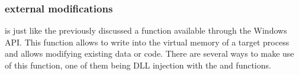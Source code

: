 \subsubsection{ external modifications}
 is just like the previously discussed  a function available through the Windows API. This function allows to write into the virtual memory of a target process and allows modifying existing data or code. There are several ways to make use of this function, one of them being DLL injection with the  and  functions. 


